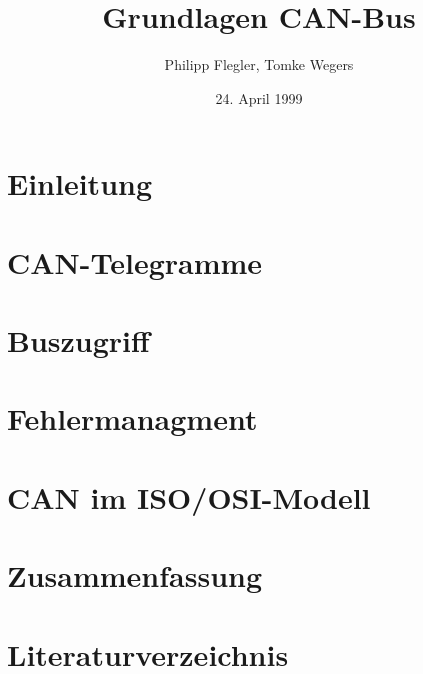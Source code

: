 \documentclass[parskip=half]{scrartcl}
\begin{document}

\title{Grundlagen CAN-Bus}
\author{Philipp Flegler, Tomke Wegers}
\date{24. April 1999}

\maketitle

\newpage
\tableofcontents
\newpage

\section{Einleitung}

    

\section{CAN-Telegramme}

    
\section{Buszugriff}

\section{Fehlermanagment}

    

\section{CAN im ISO/OSI-Modell}

    
\section{Zusammenfassung}


\newpage

\section{Literaturverzeichnis}
\printbibliography[title={ }]%
\newpage
\listoffigures
\end{document}
